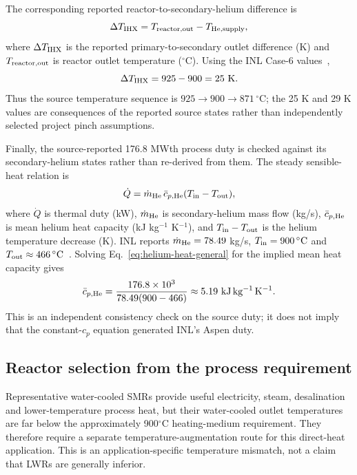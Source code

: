 The corresponding reported reactor-to-secondary-helium difference is
\begin{equation}\label{eq:ihx-dt-general}
\Delta T_{\rm IHX}
=T_{\rm reactor,out}-T_{\rm He,supply},
\end{equation}
where $\Delta T_{\rm IHX}$ is the reported primary-to-secondary outlet difference (K) and $T_{\rm reactor,out}$ is reactor outlet temperature ($^{\circ}$C). Using the INL Case-6 values~\cite{inltev961},
\begin{equation}\label{eq:temperature-cascade}
\Delta T_{\rm IHX}=925-900=25~\mathrm K.
\end{equation}
Thus the source temperature sequence is $925\rightarrow900\rightarrow871\,^{\circ}\mathrm C$; the 25 K and 29 K values are consequences of the reported source states rather than independently selected project pinch assumptions.

Finally, the source-reported 176.8 MWth process duty is checked against its secondary-helium states rather than re-derived from them. The steady sensible-heat relation is
\begin{equation}\label{eq:helium-heat-general}
\dot Q=\dot m_{\rm He}\,\bar c_{p,\rm He}
(T_{\rm in}-T_{\rm out}),
\end{equation}
where $\dot Q$ is thermal duty (kW), $\dot m_{\rm He}$ is secondary-helium mass flow (kg/s), $\bar c_{p,\rm He}$ is mean helium heat capacity (kJ kg$^{-1}$ K$^{-1}$), and $T_{\rm in}-T_{\rm out}$ is the helium temperature decrease (K). INL reports $\dot m_{\rm He}=78.49$ kg/s, $T_{\rm in}=900\,^{\circ}\mathrm C$ and $T_{\rm out}\approx466\,^{\circ}\mathrm C$~\cite{inltev961}. Solving Eq.~\ref{eq:helium-heat-general} for the implied mean heat capacity gives
\begin{equation}\label{eq:helium-cp-check}
\bar c_{p,\rm He}
=\frac{176.8\times10^3}
{78.49(900-466)}
\approx5.19~\mathrm{kJ\,kg^{-1}\,K^{-1}}.
\end{equation}
This is an independent consistency check on the source duty; it does not imply that the constant-$c_p$ equation generated INL's Aspen duty.

\TemperatureCascadeFigure

\subsection{Reactor selection from the process requirement}
Representative water-cooled SMRs provide useful electricity, steam, desalination and lower-temperature process heat, but their water-cooled outlet temperatures are far below the approximately 900$^\circ$C heating-medium requirement.  They therefore require a separate temperature-augmentation route for this direct-heat application.  This is an application-specific temperature mismatch, not a claim that LWRs are generally inferior.

